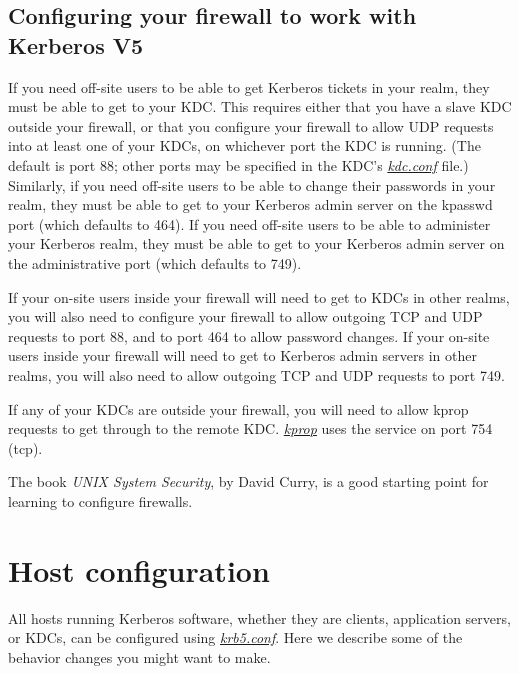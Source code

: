 \documentclass[letterpaper,10pt,english]{sphinxmanual}
\begin{document}
\section{Configuring your firewall to work with Kerberos V5}
\label{admin/appl_servers:conf-firewall}\label{admin/appl_servers:configuring-your-firewall-to-work-with-kerberos-v5}
If you need off-site users to be able to get Kerberos tickets in your
realm, they must be able to get to your KDC.  This requires either
that you have a slave KDC outside your firewall, or that you configure
your firewall to allow UDP requests into at least one of your KDCs, on
whichever port the KDC is running.  (The default is port 88; other
ports may be specified in the KDC's {\hyperref[admin/conf_files/kdc_conf:kdc-conf-5]{\emph{kdc.conf}}} file.)
Similarly, if you need off-site users to be able to change their
passwords in your realm, they must be able to get to your Kerberos
admin server on the kpasswd port (which defaults to 464).  If you need
off-site users to be able to administer your Kerberos realm, they must
be able to get to your Kerberos admin server on the administrative
port (which defaults to 749).

If your on-site users inside your firewall will need to get to KDCs in
other realms, you will also need to configure your firewall to allow
outgoing TCP and UDP requests to port 88, and to port 464 to allow
password changes.  If your on-site users inside your firewall will
need to get to Kerberos admin servers in other realms, you will also
need to allow outgoing TCP and UDP requests to port 749.

If any of your KDCs are outside your firewall, you will need to allow
kprop requests to get through to the remote KDC.  {\hyperref[admin/admin_commands/kprop:kprop-8]{\emph{kprop}}} uses
the  service on port 754 (tcp).

The book \emph{UNIX System Security}, by David Curry, is a good starting
point for learning to configure firewalls.


\chapter{Host configuration}
\label{admin/host_config:host-configuration}\label{admin/host_config::doc}
All hosts running Kerberos software, whether they are clients,
application servers, or KDCs, can be configured using
{\hyperref[admin/conf_files/krb5_conf:krb5-conf-5]{\emph{krb5.conf}}}.  Here we describe some of the behavior changes
you might want to make.
\end{document}
